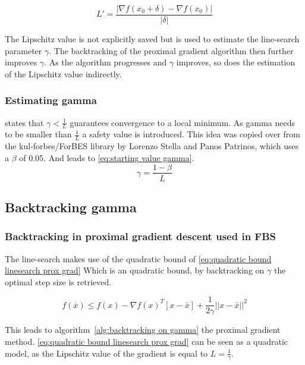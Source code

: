			\begin{equation}
			L' = \frac{|\nabla f(x_0+\delta)-\nabla f(x_0)|}{|\delta|}
			\label{eq:estimated lipschitz value in starting position}
			\end{equation}
			
			The Lipschitz value is not explicitly saved but is used to estimate the line-search parameter $\gamma$. The backtracking of the proximal gradient algorithm then further improves $\gamma$. As the algorithm progresses and $\gamma$ improves, so does the estimation of the Lipschitz value indirectly.
		
		\subsubsection{Estimating gamma}	
			\cite{LorenzoStella2017} states that $\gamma<\frac{1}{L}$ guarantees convergence to a local minimum. As gamma needs to be smaller than $\frac{1}{L}$ a safety value is introduced. This idea was copied over from the kul-forbes/ForBES library by Lorenzo Stella and Panos Patrinos, which uses a $\beta$ of 0.05. And leads to \eqref{eq:starting value gamma}.
			\begin{equation}
			\gamma = \frac{1-\beta}{L}
			\label{eq:starting value gamma}
			\end{equation}		
	
	\subsection{Backtracking gamma}			
		\subsubsection{Backtracking in proximal gradient descent used in FBS}
			The line-search makes use of the quadratic bound of \eqref{eq:quadratic bound linesearch prox grad} Which is an quadratic bound, by backtracking on $\gamma$ the optimal step size is retrieved.
			
			\begin{equation}
			f({\bar{x}}) \leq f(x) - \nabla f(x)^T[x-\bar{x}] + \frac{1}{2 \gamma}||x-\bar{x}||^2
			\label{eq:quadratic bound linesearch prox grad}
			\end{equation}
			
			This leads to algorithm~\ref{alg:backtracking on gamma} the proximal gradient method. \eqref{eq:quadratic bound linesearch prox grad} can be seen as a quadratic model, as the Lipschitz value of the gradient is equal to $L=\frac{1}{\gamma}$.
			
